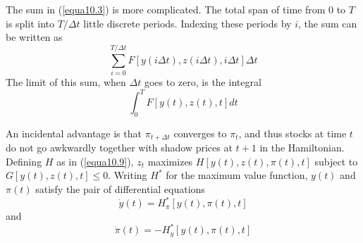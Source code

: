 The sum in (\ref{equa10.3}) is more complicated. The total span of time from 0 to $T$ is split into $T/\Delta t$ little discrete periods. Indexing these periods by $i$, the sum can be written as
\begin{equation*}
\sum\limits_{i=0}^{T/\Delta t} F[y(i \Delta t), z(i \Delta t), i \Delta t] \Delta t
\end{equation*}
The limit of this sum, when $\Delta t$ goes to zero, is the integral
\begin{equation} \label{equa10.17}
 \int_{0}^{T} F[ y(t), z(t), t ] dt
\end{equation}

An incidental advantage is that $\pi_{t+\Delta t}$ converges to $\pi_t$, and thus stocks at time $t$ do not go awkwardly together with shadow prices at $t+1$ in the Hamiltonian. Defining $H$ as in (\ref{equa10.9}), $z_t$ maximizes $H[y(t), z(t), \pi(t), t]$ subject to $G[y(t), z(t), t] \leq 0$. Writing $H^*$ for the maximum value function, $y(t)$ and $\pi(t)$ satisfy the pair of differential equations
\begin{equation} \label{equa10.18}
\dot{y} (t) = H_\pi^* [y(t), \pi(t), t]
\end{equation}
and
\begin{equation} \label{equa10.19}
\dot{\pi}(t) = - H_y^* [y(t), \pi(t), t]
\end{equation}

